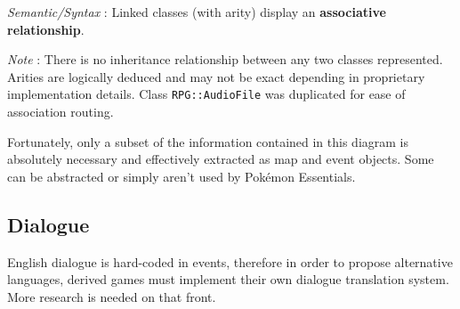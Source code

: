 \documentclass[11pt]{article}
\begin{document}
{\begin{figure}[!h]
\end{figure}


\textit{Semantic/Syntax} : Linked classes (with arity) display an \textbf{associative relationship}.

\textit{Note} : There is no inheritance relationship between any two classes represented. Arities are logically deduced and may not be exact depending in proprietary implementation details. Class \verb|RPG::AudioFile| was duplicated for ease of association routing.

Fortunately, only a subset of the information contained in this diagram is absolutely necessary and effectively extracted as map and event objects. Some can be abstracted or simply aren't used by Pokémon Essentials. 


\subsection*{Dialogue}

English dialogue is hard-coded in events, therefore in order to propose alternative languages, derived games must implement their own dialogue translation system. More research is needed on that front.

\newpage
}
\end{document}
